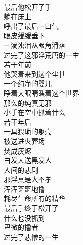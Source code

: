 \begin{poem}[尘世卑微的撸者]
    \begin{multicols}{2}
        \begin{center}~\\
            最后他松开了手 \\ 躺在床上 \\ 呼出了最后一口气 \\ 眼皮缓缓垂下 \\ 一滴浊泪从眼角滑落 \\ 过完了这邪淫荒唐的一生 \\ 若干年前 \\ 他哭着来到这个尘世 \\ 一个纯净的婴儿 \\ 睁着大眼睛瞧着这个世界 \\ 那么的纯真无邪 \\ 小手在空中抓着什么 \\ 若干年后 \\ 一具猥琐的躯壳 \\ 被送进火葬场 \\ 焚成灰烬 \\ 白发人送黑发人 \\ 人间的悲剧 \\ 邪淫真是大不孝 \\ 浑浑噩噩地撸 \\ 耗尽生命所有的精华 \\ 最后手终于松开了 \\ 什么也没抓到 \\ 卑微的撸者 \\ 过完了悲惨的一生
        \end{center}
    \end{multicols}
\end{poem}

